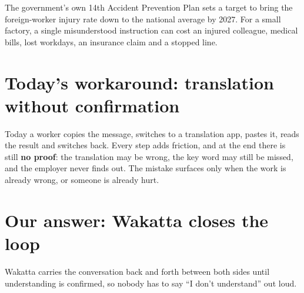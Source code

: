 \documentclass[11pt,a4paper]{article}
\begin{document}
The government's own 14th Accident Prevention Plan sets a target to bring the foreign-worker injury rate down to the national average by 2027. For a small factory, a single misunderstood instruction can cost an injured colleague, medical bills, lost workdays, an insurance claim and a stopped line.

\section{Today's workaround: translation without confirmation}

Today a worker copies the message, switches to a translation app, pastes it, reads the result and switches back. Every step adds friction, and at the end there is still \textbf{no proof}: the translation may be wrong, the key word may still be missed, and the employer never finds out. The mistake surfaces only when the work is already wrong, or someone is already hurt.

\section{Our answer: Wakatta closes the loop}

Wakatta carries the conversation back and forth between both sides until understanding is confirmed, so nobody has to say ``I don't understand'' out loud.

\begin{center}
\end{center}
\end{document}
